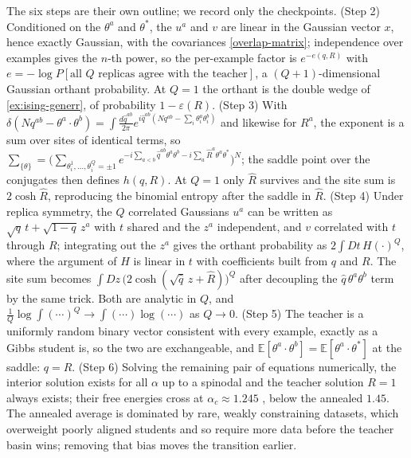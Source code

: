\documentclass[11pt]{article}
\newcommand{\E}{\mathbb{E}}
\begin{document}
\begin{solution}[ex:replica]
The six steps are their own outline; we record only the checkpoints. (Step 2) Conditioned on the $\theta^a$ and $\theta^*$, the $u^a$ and $v$ are linear in the Gaussian vector $x$, hence exactly Gaussian, with the covariances \eqref{overlap-matrix}; independence over examples gives the $n$-th power, so the per-example factor is $e^{-e(q,R)}$ with $e = -\log P[\text{all } Q\text{ replicas agree with the teacher}]$, a $(Q{+}1)$-dimensional Gaussian orthant probability. At $Q=1$ the orthant is the double wedge of \cref{ex:ising-generr}, of probability $1-\varepsilon(R)$. (Step 3) With $\delta(Nq^{ab}-\theta^a\cdot\theta^b) = \int\frac{d\hat q^{ab}}{2\pi}e^{i\hat q^{ab}(Nq^{ab}-\sum_i\theta^a_i\theta^b_i)}$ and likewise for $R^a$, the exponent is a sum over sites of identical terms, so $\sum_{\{\theta\}} = \big(\sum_{\theta^1_i,\ldots,\theta^Q_i=\pm1}e^{-i\sum_{a<b}\hat q^{ab}\theta^a\theta^b - i\sum_a\hat R^a\theta^a\theta^*}\big)^N$; the saddle point over the conjugates then defines $h(q,R)$. At $Q=1$ only $\hat R$ survives and the site sum is $2\cosh\hat R$, reproducing the binomial entropy after the saddle in $\hat R$. (Step 4) Under replica symmetry, the $Q$ correlated Gaussians $u^a$ can be written as $\sqrt{q}\,t + \sqrt{1-q}\,z^a$ with $t$ shared and the $z^a$ independent, and $v$ correlated with $t$ through $R$; integrating out the $z^a$ gives the orthant probability as $2\int Dt\,H(\cdot)^Q$, where the argument of $H$ is linear in $t$ with coefficients built from $q$ and $R$. The site sum becomes $\int Dz\,\big(2\cosh(\sqrt{\hat q}\,z+\hat R)\big)^Q$ after decoupling the $\hat q\,\theta^a\theta^b$ term by the same trick. Both are analytic in $Q$, and $\frac{1}{Q}\log\int(\cdots)^Q\to\int(\cdots)\log(\cdots)$ as $Q\to0$. (Step 5) The teacher is a uniformly random binary vector consistent with every example, exactly as a Gibbs student is, so the two are exchangeable, and $\E[\theta^a\cdot\theta^b] = \E[\theta^a\cdot\theta^*]$ at the saddle: $q = R$. (Step 6) Solving the remaining pair of equations numerically, the interior solution exists for all $\alpha$ up to a spinodal and the teacher solution $R=1$ always exists; their free energies cross at $\alpha_c\approx1.245$ \cite{gyorgyi1990first}, below the annealed $1.45$. The annealed average is dominated by rare, weakly constraining datasets, which overweight poorly aligned students and so require more data before the teacher basin wins; removing that bias moves the transition earlier.
\end{solution}
\end{document}
